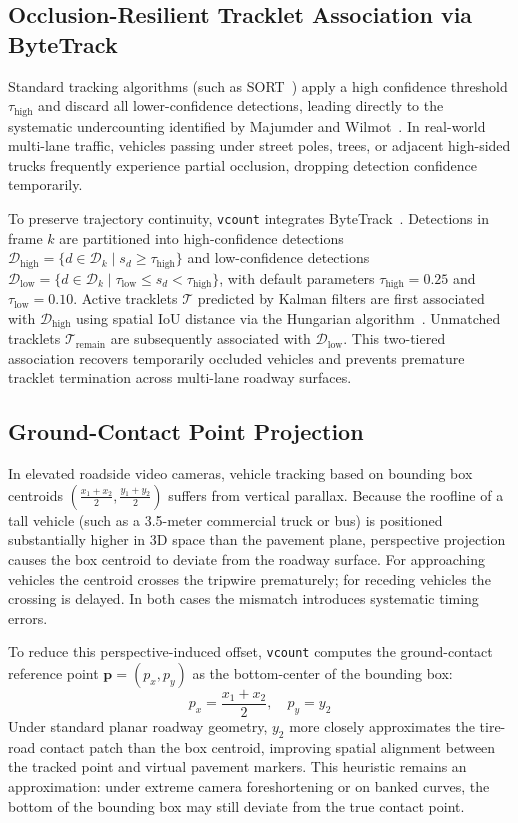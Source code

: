 \subsection{Occlusion-Resilient Tracklet Association via ByteTrack}
Standard tracking algorithms (such as SORT~\cite{bewley2016sort}) apply a high confidence threshold $\tau_{\text{high}}$ and discard all lower-confidence detections, leading directly to the systematic undercounting identified by Majumder and Wilmot~\cite{majumder2023automated}. In real-world multi-lane traffic, vehicles passing under street poles, trees, or adjacent high-sided trucks frequently experience partial occlusion, dropping detection confidence temporarily.

To preserve trajectory continuity, \texttt{vcount} integrates ByteTrack~\cite{zhang2022bytetrack}. Detections in frame $k$ are partitioned into high-confidence detections $\mathcal{D}_{\text{high}} = \{d \in \mathcal{D}_k \mid s_d \ge \tau_{\text{high}}\}$ and low-confidence detections $\mathcal{D}_{\text{low}} = \{d \in \mathcal{D}_k \mid \tau_{\text{low}} \le s_d < \tau_{\text{high}}\}$, with default parameters $\tau_{\text{high}} = 0.25$ and $\tau_{\text{low}} = 0.10$. Active tracklets $\mathcal{T}$ predicted by Kalman filters are first associated with $\mathcal{D}_{\text{high}}$ using spatial IoU distance via the Hungarian algorithm~\cite{kuhn1955hungarian}. Unmatched tracklets $\mathcal{T}_{\text{remain}}$ are subsequently associated with $\mathcal{D}_{\text{low}}$. This two-tiered association recovers temporarily occluded vehicles and prevents premature tracklet termination across multi-lane roadway surfaces.

\subsection{Ground-Contact Point Projection}
In elevated roadside video cameras, vehicle tracking based on bounding box centroids $(\frac{x_1+x_2}{2}, \frac{y_1+y_2}{2})$ suffers from vertical parallax. Because the roofline of a tall vehicle (such as a 3.5-meter commercial truck or bus) is positioned substantially higher in 3D space than the pavement plane, perspective projection causes the box centroid to deviate from the roadway surface. For approaching vehicles the centroid crosses the tripwire prematurely; for receding vehicles the crossing is delayed. In both cases the mismatch introduces systematic timing errors.

To reduce this perspective-induced offset, \texttt{vcount} computes the ground-contact reference point $\mathbf{p} = (p_x, p_y)$ as the bottom-center of the bounding box:
\begin{equation}
    p_x = \frac{x_1 + x_2}{2}, \quad p_y = y_2
    \label{eq:ground_contact}
\end{equation}
Under standard planar roadway geometry, $y_2$ more closely approximates the tire-road contact patch than the box centroid, improving spatial alignment between the tracked point and virtual pavement markers. This heuristic remains an approximation: under extreme camera foreshortening or on banked curves, the bottom of the bounding box may still deviate from the true contact point.

